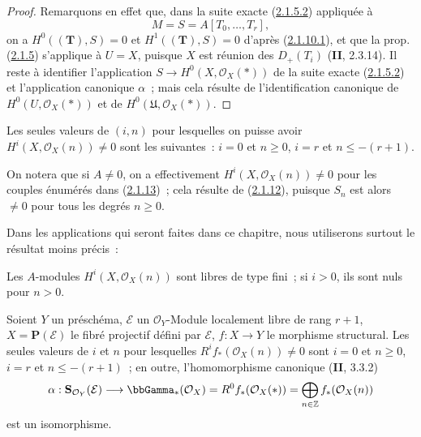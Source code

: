 \begin{proof}
Remarquons en effet que, dans la suite exacte
(\hyperref[III.2.1.5.2-fr]{2.1.5.2}) appliquée à
\[
M=S=A[T_0,\ldots,T_r],
\]
on a
$H^0((\mathbf T),S)=0$ et $H^1((\mathbf T),S)=0$ d'après
(\hyperref[III.2.1.10.1-fr]{2.1.10.1}), et que la prop.
(\hyperref[III.2.1.5-fr]{2.1.5}) s'applique à $U=X$, puisque $X$ est
réunion des $D_+(T_i)$ (\textbf{II}, 2.3.14). Il reste à identifier l'application
$S\to H^0(X,\mathcal O_X(*))$ de la suite exacte
(\hyperref[III.2.1.5.2-fr]{2.1.5.2}) et l'application canonique $\alpha$~;
mais cela résulte de l'identification canonique de
$H^0(U,\mathcal O_X(*))$ et de $H^0(\mathfrak U,\mathcal O_X(*))$.
\end{proof}

\begin{corollary}[2.1.13]
\label{III.2.1.13-fr}
Les seules valeurs de $(i,n)$ pour lesquelles on puisse avoir
$H^i(X,\mathcal O_X(n))\neq0$ sont les suivantes~:
$i=0$ et $n\geq0$, $i=r$ \textup{et} $n\leq-(r+1)$.
\end{corollary}

On notera que si $A\neq0$, on a effectivement
$H^i(X,\mathcal O_X(n))\neq0$ pour les couples énumérés dans
(\hyperref[III.2.1.13-fr]{2.1.13})~; cela résulte de
(\hyperref[III.2.1.12-fr]{2.1.12}), puisque $S_n$ est alors $\neq0$ pour
tous les degrés $n\geq0$.

Dans les applications qui seront faites dans ce chapitre, nous utiliserons
surtout le résultat moins précis~:

\begin{corollary}[2.1.14]
\label{III.2.1.14-fr}
Les $A$-modules $H^i(X,\mathcal O_X(n))$ sont libres de type fini~; si
$i>0$, ils sont nuls pour $n>0$.
\end{corollary}

\begin{proposition}[2.1.15]
\label{III.2.1.15-fr}
Soient $Y$ un préschéma, $\mathcal E$ un $\mathcal O_Y$-Module localement
libre de rang $r+1$, $X=\mathbf P(\mathcal E)$ le fibré projectif défini
par $\mathcal E$, $f:X\to Y$ le morphisme structural. Les seules valeurs de
$i$ et $n$ pour lesquelles $R^if_*(\mathcal O_X(n))\neq0$ sont
$i=0$ et $n\geq0$, $i=r$ et $n\leq-(r+1)$~; en outre, l'homomorphisme
canonique (\textbf{II}, 3.3.2)
\[
\alpha:\mathbf S_{\mathcal O_Y}(\mathcal E)
\longrightarrow\bbGamma_*(\mathcal O_X)
=R^0f_*(\mathcal O_X(*))
=\bigoplus_{n\in\mathbb Z}f_*(\mathcal O_X(n))
\]
est un isomorphisme.
\end{proposition}

